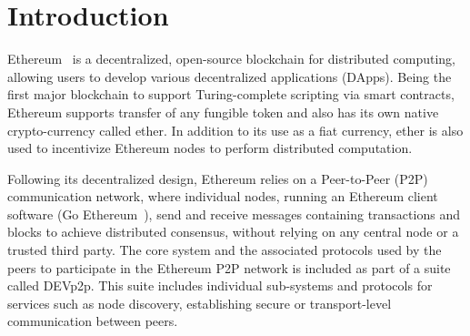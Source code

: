 
\section{Introduction}

Ethereum~\cite{} is a decentralized, open-source blockchain for distributed computing, allowing users to develop various decentralized applications (DApps). Being the first major blockchain to support Turing-complete scripting via smart contracts, Ethereum supports transfer of any fungible token and also has its own native crypto-currency called ether. In addition to its use as a fiat currency,  ether is also used to incentivize Ethereum nodes to perform distributed computation. 



Following its decentralized design, Ethereum relies on a Peer-to-Peer (P2P) communication network, where individual nodes, running an Ethereum client software (\eg Go Ethereum~\cite{go-ethereum}), send and receive messages containing transactions and blocks to achieve distributed consensus, without relying on any central node or a trusted third party. The core system and the associated protocols used by the peers to participate in the Ethereum P2P network is included as part of a suite called DEVp2p. This suite includes individual sub-systems and protocols for services such as node discovery, establishing secure or transport-level communication between peers. 

